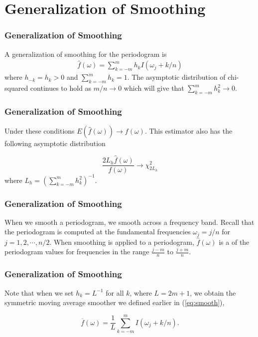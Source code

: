 \documentclass[%
xcolor=pdftex]{beamer}
\begin{document}
\section{Generalization of Smoothing}
\frame{\tableofcontents[currentsection]}

\begin{frame}
\frametitle{Generalization of Smoothing}

A generalization of smoothing for the periodogram is
\begin{eqnarray}\label{eq:1}
\widehat{f}(\omega)= \sum_{k=-m}^{m} h_k I(\omega_j + k/n)
\end{eqnarray}
where $h_{-k}=h_k>0$ and $ \sum_{k=-m}^{m}  h_k=1$. The asymptotic distribution of chi-squared continues to hold as $m/n \rightarrow 0$ which will give that $ \sum_{k=-m}^{m}  h_k^2 \rightarrow 0$.

\end{frame}




\begin{frame}
\frametitle{Generalization of Smoothing}

Under these conditions $E(\widehat{f}(\omega)) \rightarrow f(\omega)$.  This estimator also has the following asymptotic distribution

\begin{equation} \label{eq:asymp}
\frac{2 L_h  \widehat{f}(\omega)}{f(\omega)} \rightarrow \chi_{2 L_h}^2
\end{equation}
where $L_h = \left( \sum_{k=-m}^{m}  h_k^2 \right)^{-1}$.

\end{frame}

\begin{frame}
\frametitle{Generalization of Smoothing}

When we smooth a periodogram, we smooth across a frequency band. Recall that the periodogram is computed at the fundamental frequencies $\omega_j = j/n$ for $j=1, 2, \cdots, n/2$. When smoothing is applied to a periodogram, $\widehat{f}(\omega)$ is a \underline{\hspace{15 mm}} \underline{\hspace{15 mm}} of the periodogram values for frequencies in the range $\frac{j-m}{n}$ to $\frac{j+m}{n}$.

\end{frame}

\begin{frame}
\frametitle{Generalization of Smoothing}

Note that when we set $h_k = L^{-1}$ for all $k$, where $L=2m+1$, we obtain the symmetric moving average smoother we defined earlier in (\ref{eq:smooth}),

\begin{equation*}
\overline{f}(\omega)=\frac{1}{L} \sum_{k=-m}^{m} I(\omega_j + k/n).
\end{equation*}

\end{frame}
\end{document}
